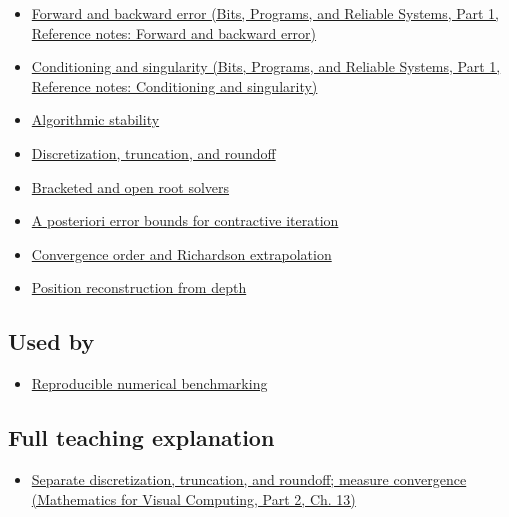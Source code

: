 \begin{itemize}
\tightlist
\item
  \href{../01-Bits-Programs-and-Reliable-Systems-P01/main.pdf\#nameddest=appendix-a7fbaf6d1b1c}{Forward and backward error (Bits, Programs, and Reliable Systems, Part 1, Reference notes: Forward and backward error)}
\item
  \href{../01-Bits-Programs-and-Reliable-Systems-P01/main.pdf\#nameddest=appendix-8f6a01f284a7}{Conditioning and singularity (Bits, Programs, and Reliable Systems, Part 1, Reference notes: Conditioning and singularity)}
\item
  \hyperref[appendix-aa2bf0d79639]{Algorithmic stability}
\item
  \hyperref[appendix-6b0648b2b8e8]{Discretization, truncation, and roundoff}
\item
  \hyperref[appendix-f63eb850796d]{Bracketed and open root solvers}
\item
  \hyperref[appendix-d83b0ad1be7f]{A posteriori error bounds for contractive iteration}
\item
  \hyperref[appendix-aca80b6bf17a]{Convergence order and Richardson extrapolation}
\item
  \hyperref[appendix-2cbf2968e866]{Position reconstruction from depth}
\end{itemize}

\subsection{Used by}\label{appendix-31b8c295e05f-used-by}

\hypertarget{appendix-31b8c295e05f-used-by}{}

\begin{itemize}
\tightlist
\item
  \hyperref[appendix-b9db93e28371]{Reproducible numerical benchmarking}
\end{itemize}

\subsection{Full teaching explanation}\label{appendix-31b8c295e05f-full-teaching-explanation}

\hypertarget{appendix-31b8c295e05f-full-teaching-explanation}{}

\begin{itemize}
\tightlist
\item
  \href{../02-Mathematics-for-Visual-Computing-P02/main.pdf\#nameddest=02-foundations-ii-ch029-separate-discretization-truncation-and-roundoff-measure-convergence}{Separate discretization, truncation, and roundoff; measure convergence (Mathematics for Visual Computing, Part 2, Ch. 13)}
\end{itemize}

